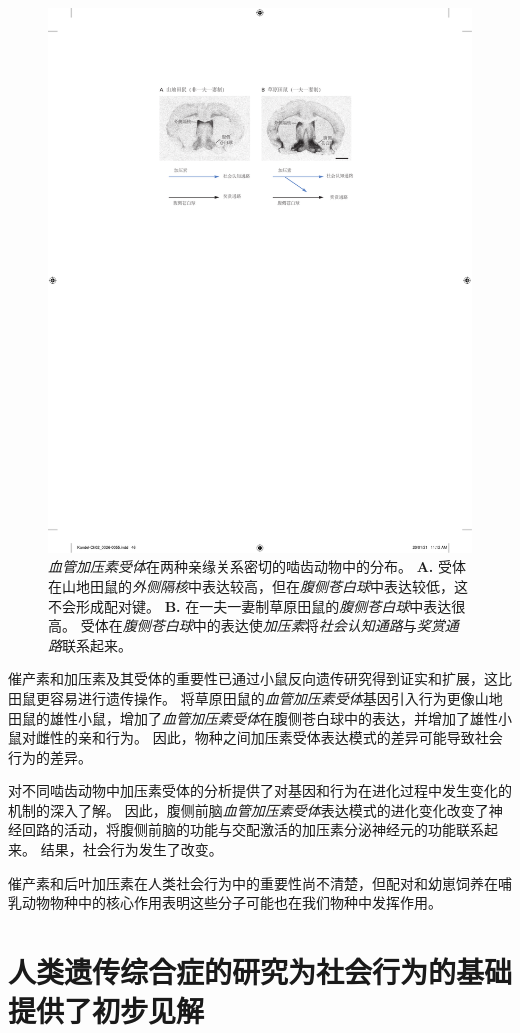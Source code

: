 \begin{figure}[htbp]
	\centering
	\includegraphics[width=0.7\linewidth]{chap02/fig_2_16}
	\caption{\textit{血管加压素受体}在两种亲缘关系密切的啮齿动物中的分布\cite{young2001cellular}。
		\textbf{A.} 受体在山地田鼠的\textit{外侧隔核}中表达较高，但在\textit{腹侧苍白球}中表达较低，这不会形成配对键。
		\textbf{B.} 在一夫一妻制草原田鼠的\textit{腹侧苍白球}中表达很高。
		受体在\textit{腹侧苍白球}中的表达使\textit{加压素}将\textit{社会认知通路}与\textit{奖赏通路}联系起来。}
	\label{fig:2_16}
\end{figure}


催产素和加压素及其受体的重要性已通过小鼠反向遗传研究得到证实和扩展，这比田鼠更容易进行遗传操作。
将草原田鼠的\textit{血管加压素受体}基因引入行为更像山地田鼠的雄性小鼠，增加了\textit{血管加压素受体}在腹侧苍白球中的表达，并增加了雄性小鼠对雌性的亲和行为。
因此，物种之间加压素受体表达模式的差异可能导致社会行为的差异。


对不同啮齿动物中加压素受体的分析提供了对基因和行为在进化过程中发生变化的机制的深入了解。
因此，腹侧前脑\textit{血管加压素受体}表达模式的进化变化改变了神经回路的活动，将腹侧前脑的功能与交配激活的加压素分泌神经元的功能联系起来。
结果，社会行为发生了改变。


催产素和后叶加压素在人类社会行为中的重要性尚不清楚，但配对和幼崽饲养在哺乳动物物种中的核心作用表明这些分子可能也在我们物种中发挥作用。



\section{人类遗传综合症的研究为社会行为的基础提供了初步见解}

